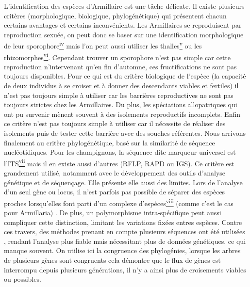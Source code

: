 L'identification des espèces d'Armillaire est une tâche délicate. Il existe plusieurs critères (morphologique, biologique, phylogénétique) qui présentent chacun certains avantages et certains inconvénients. Les Armillaires se reproduisent par reproduction sexuée, on peut donc se baser sur une identification morphologique de leur sporophore\hyperref[bib:biblioIV]{\textsuperscript{iv}} mais l'on peut aussi utiliser les thalles\hyperref[bib:biblioV]{\textsuperscript{v}} ou les rhizomorphes\hyperref[bib:biblioVI]{\textsuperscript{vi}}. Cependant trouver un sporophore n'est pas simple car cette reproduction n'intervenant qu'en fin d'automne, ces fructifications ne sont pas toujours disponibles. Pour ce qui est du critère biologique de l'espèce (la capacité de deux individus à se croiser et à donner des descendants viables et fertiles) il n'est pas toujours simple à utiliser car les barrières reproductives ne sont pas toujours strictes chez les Armillaires. Du plus, les spéciations allopatriques qui ont pu survenir mènent souvent à des isolements reproductifs incomplets. Enfin ce critère n'est pas toujours simple à utiliser car il nécessite de réaliser des isolements puis de tester cette barrière avec des souches référentes. Nous arrivons finalement au critère phylogénétique, basé sur la similarité de séquence nucléotidiques. Pour les champignons, la séquence dite marqueur universel est l'ITS\hyperref[bib:biblioVII]{\textsuperscript{vii}} \cite{Schoch2012, Chillali1998} mais il en existe aussi d'autres (RFLP, RAPD ou IGS). Ce critère est grandement utilisé, notamment avec le développement des outils d'analyse génétique et de séquençage. Elle présente elle aussi des limites. Lors de l'analyse d'un seul gène ou locus, il n'est parfois pas possible de séparer des espèces proches lorsqu'elles font parti d'un complexe d'espèces\hyperref[bib:biblioVIII]{\textsuperscript{viii}} (comme c'est le cas pour Armillaria) \cite{Taylor2000}. De plus, un polymorphisme intra-spécifique peut aussi compliquer cette distinction, limitant les variations fixées entres espèces. Contre ces travers, des méthodes prenant en compte plusieurs séquences ont été utilisées \cite{Tsykun2013}, rendant l'analyse plus fiable mais nécessitant plus de données génétiques, ce qui manque souvent. On utilise ici la congruence des phylogénies, lorsque les arbres de plusieurs gènes sont congruents cela démontre que le flux de gènes est interrompu depuis plusieurs générations, il n'y a ainsi plus de croisements viables ou possibles.

